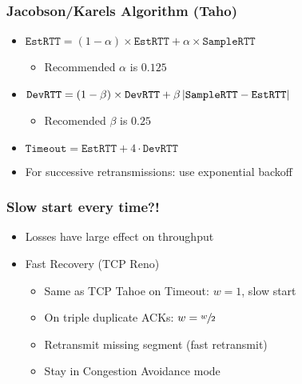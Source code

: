 \subsubsection{Jacobson/Karels Algorithm (Taho)}
\begin{itemize}[nosep]
    \item $\texttt{EstRTT} = (1 - \alpha)\times\texttt{EstRTT} + \alpha\times\texttt{SampleRTT}$
          \begin{itemize}[nosep]
              \item Recommended $\alpha$ is $0.125$
          \end{itemize}
    \item $\texttt{DevRTT} = (1 - \beta)\times\texttt{DevRTT} + \beta\left\lvert\texttt{SampleRTT} - \texttt{EstRTT}\right\rvert$
          \begin{itemize}[nosep]
              \item Recomended $\beta$ is $0.25$
          \end{itemize}
    \item $\texttt{Timeout} = \texttt{EstRTT} + 4\cdot\texttt{DevRTT}$
    \item For successive retransmissions: use exponential backoff
\end{itemize}
\subsubsection{Slow start every time?!}
\begin{itemize}[nosep]
    \item Losses have large effect on throughput
    \item Fast Recovery (TCP Reno)
          \begin{itemize}[nosep]
              \item Same as TCP Tahoe on Timeout: $w=1$, slow start
              \item On triple duplicate ACKs: $w = \sfrac{w}{2}$
              \item Retransmit missing segment (fast retransmit)
              \item Stay in Congestion Avoidance mode
          \end{itemize}
\end{itemize}
